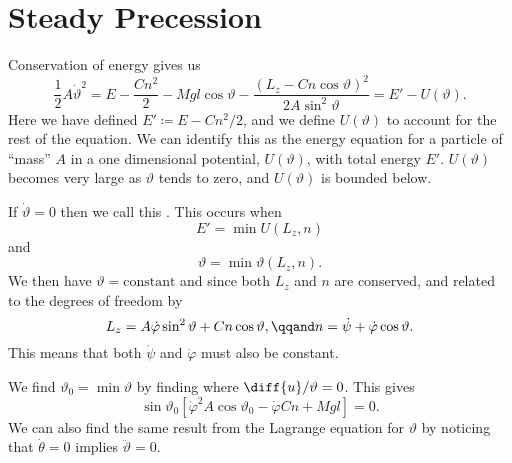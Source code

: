 \documentclass[fleqn]{NotesClass}
\begin{document}
    \section{Steady Precession}
    Conservation of energy gives us
    \begin{equation}
        \frac{1}{2}A\dot{\vartheta}^2 = E - \frac{Cn^2}{2} - Mgl\cos\vartheta - \frac{(L_z - Cn\cos\vartheta)^2}{2A\sin^2\vartheta} = E' - U(\vartheta).
    \end{equation}
    Here we have defined \(E' \coloneqq E - Cn^2/2\), and we define \(U(\vartheta)\) to account for the rest of the equation.
    We can identify this as the energy equation for a particle of \enquote{mass} \(A\) in a one dimensional potential, \(U(\vartheta)\), with total energy \(E'\).
    \(U(\vartheta)\) becomes very large as \(\vartheta\) tends to zero, and \(U(\vartheta)\) is bounded below.
    
    If \(\dot{\vartheta} = 0\) then we call this .
    This occurs when
    \begin{equation}
        E' = \min U(L_z, n)
    \end{equation}
    and
    \begin{equation}
        \vartheta = \min \vartheta(L_z, n).
    \end{equation}
    We then have \(\vartheta = \text{constant}\) and since both \(L_z\) and \(n\) are conserved, and related to the degrees of freedom by
    \begin{equation}
        L_z = A\dot{\varphi}\sin^2\vartheta + Cn\cos\vartheta, \qqand n = \dot{\psi} + \dot{\varphi}\cos\vartheta.
    \end{equation}
    This means that both \(\dot{\psi}\) and \(\dot{\varphi}\) must also be constant.
    
    We find \(\vartheta_0 = \min \vartheta\) by finding where \(\diff{u}/{\vartheta} = 0\).
    This gives
    \begin{equation}
        \sin\vartheta_0 [\dot{\varphi}^2 A\cos\vartheta_0 - \dot{\varphi}Cn + Mgl] = 0.
    \end{equation}
    We can also find the same result from the Lagrange equation for \(\vartheta\) by noticing that \(\dot{\theta} = 0\) implies \(\ddot{\vartheta} = 0\).
    
\end{document}
